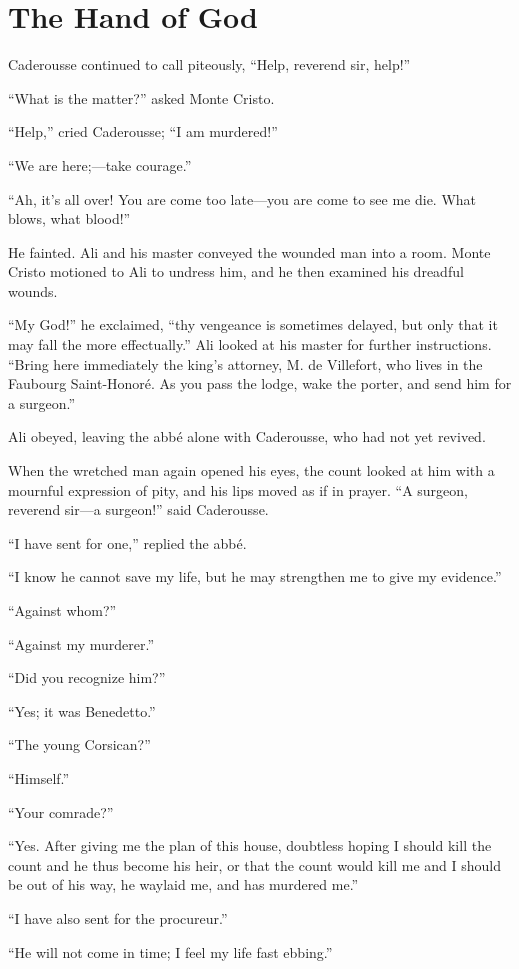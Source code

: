 \chapter{The Hand of God}

Caderousse continued to call piteously, “Help, reverend sir, help!”

“What is the matter?” asked Monte Cristo.

“Help,” cried Caderousse; “I am murdered!”

“We are here;—take courage.”

“Ah, it’s all over! You are come too late—you are come to see me die.
What blows, what blood!”

He fainted. Ali and his master conveyed the wounded man into a room.
Monte Cristo motioned to Ali to undress him, and he then examined his
dreadful wounds.

“My God!” he exclaimed, “thy vengeance is sometimes delayed, but only
that it may fall the more effectually.” Ali looked at his master for
further instructions. “Bring here immediately the king’s attorney, M.
de Villefort, who lives in the Faubourg Saint-Honoré. As you pass the
lodge, wake the porter, and send him for a surgeon.”

Ali obeyed, leaving the abbé alone with Caderousse, who had not yet
revived.

When the wretched man again opened his eyes, the count looked at him
with a mournful expression of pity, and his lips moved as if in prayer.
“A surgeon, reverend sir—a surgeon!” said Caderousse.

“I have sent for one,” replied the abbé.

“I know he cannot save my life, but he may strengthen me to give my
evidence.”

“Against whom?”

“Against my murderer.”

“Did you recognize him?”

“Yes; it was Benedetto.”

“The young Corsican?”

“Himself.”

“Your comrade?”

“Yes. After giving me the plan of this house, doubtless hoping I should
kill the count and he thus become his heir, or that the count would
kill me and I should be out of his way, he waylaid me, and has murdered
me.”

“I have also sent for the procureur.”

“He will not come in time; I feel my life fast ebbing.”

